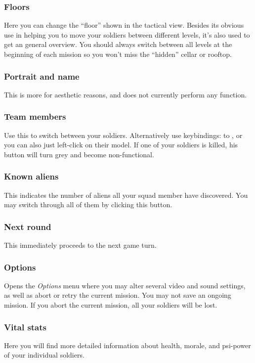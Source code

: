 \subsubsection{Floors}
Here you can change the ``floor'' shown in the tactical view. Besides its obvious use in helping you to move your soldiers between different levels, it's also used to get an general overview. You should always switch between all levels at the beginning of each mission so you won't miss the ``hidden'' cellar or rooftop.

\subsubsection{Portrait and name}
This is more for aesthetic reasons, and does not currently perform any function.

\subsubsection{Team members}
Use this to switch between your soldiers. Alternatively use keybindings:  to , or you can also just left-click on their model. If one of your soldiers is killed, his button will turn grey and become non-functional.

\subsubsection{Known aliens}
This indicates the number of aliens all your squad member have discovered. You may switch through all of them by clicking this button.

\subsubsection{Next round}
This immediately proceeds to the next game turn.

\subsubsection{Options}
Opens the \emph{Options} menu where you may alter several video and sound settings, as well as abort or retry the current mission. You may not save an ongoing mission. If you abort the current mission, all your soldiers will be lost.

\subsubsection{Vital stats}
Here you will find more detailed information about health, morale, and psi-power of your individual soldiers.

